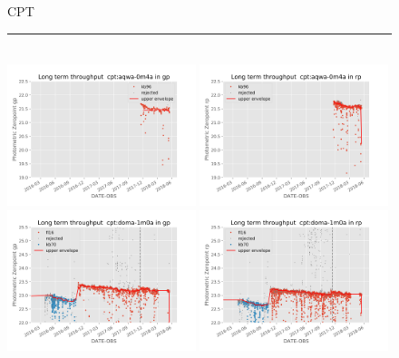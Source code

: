 \documentclass[]{spieman}
\begin{document}
\begin{figure}\ContinuedFloat
\centering
CPT \\ 
\rule{\textwidth}{0.4pt} \\
\includegraphics[width=0.49\textwidth]{images/photzptrend-cpt-aqwa-0m4a-gp.png} \hspace*{\fill}
\includegraphics[width=0.49\textwidth]{images/photzptrend-cpt-aqwa-0m4a-rp.png} \\
\includegraphics[width=0.49\textwidth]{images/photzptrend-cpt-doma-1m0a-gp.png} \hspace*{\fill} 
\includegraphics[width=0.49\textwidth]{images/photzptrend-cpt-doma-1m0a-rp.png} \\

\end{figure}
\end{document}
